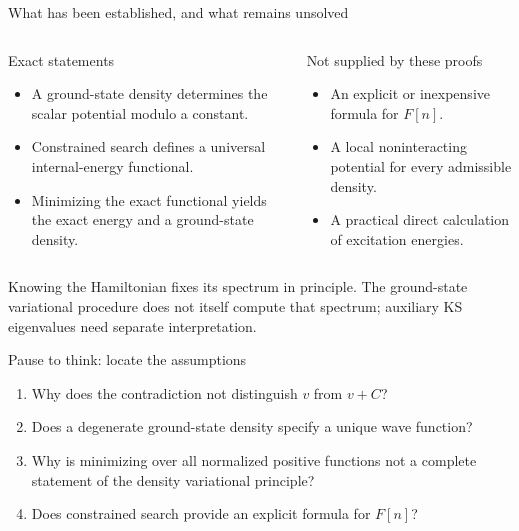 \documentclass[aspectratio=169,10pt]{beamer}
\begin{document}
\begin{frame}{What has been established, and what remains unsolved}
\begin{columns}[T]
\begin{block}{Exact statements}
\begin{itemize}
\item A ground-state density determines the scalar potential modulo a constant.
\item Constrained search defines a universal internal-energy functional.
\item Minimizing the exact functional yields the exact energy and a ground-state density.
\end{itemize}
\end{block}
\begin{exampleblock}{Not supplied by these proofs}
\begin{itemize}
\item An explicit or inexpensive formula for $F[n]$.
\item A local noninteracting potential for every admissible density.
\item A practical direct calculation of excitation energies.
\end{itemize}
\end{exampleblock}
\end{columns}
Knowing the Hamiltonian fixes its spectrum in principle. The ground-state
variational procedure does not itself compute that spectrum; auxiliary KS
eigenvalues need separate interpretation.
\end{frame}

\begin{frame}{Pause to think: locate the assumptions}
\begin{tcolorbox}[colback=palewarm,colframe=warm,title={Discuss with a neighbor}]
\begin{enumerate}
\item Why does the contradiction not distinguish $v$ from $v+C$?
\item Does a degenerate ground-state density specify a unique wave function?
\item Why is minimizing over all normalized positive functions not a complete
statement of the density variational principle?
\item Does constrained search provide an explicit formula for $F[n]$?
\end{enumerate}
\end{tcolorbox}
\end{frame}
\end{document}
